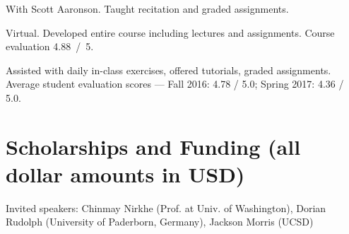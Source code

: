 \documentclass[11pt,letterpaper,serif]{moderncv}
\begin{document}
\smallskip

{
	\begin{adjustwidth}{.25in}{}
	With Scott Aaronson. Taught recitation and graded assignments.
	\end{adjustwidth}
}

\smallskip

{
	\begin{adjustwidth}{.25in}{}
		Virtual.
		Developed entire course including lectures and assignments.
		Course evaluation 4.88~/~5.
	\end{adjustwidth}
}

\smallskip

{
	\begin{adjustwidth}{.25in}{}
		Assisted with daily in-class exercises, offered tutorials, graded assignments. \newline
		Average student evaluation scores --- Fall 2016: 4.78 / 5.0; Spring 2017: 4.36 / 5.0.
	\end{adjustwidth}
}

\smallskip




\section{Scholarships and Funding \hfill{\footnotesize (all dollar amounts in USD)}}

{
\begin{adjustwidth}{.25in}{}
	Invited speakers: Chinmay Nirkhe (Prof. at Univ. of Washington), Dorian Rudolph (University of Paderborn, Germany), Jackson Morris (UCSD)
\end{adjustwidth}
}
\end{document}
